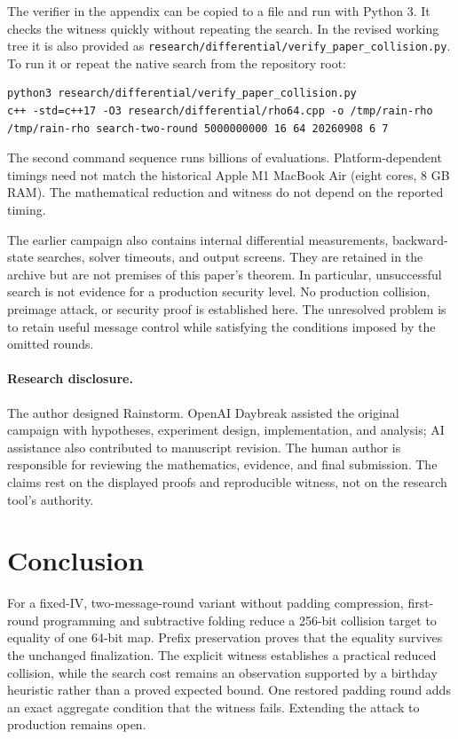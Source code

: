 \documentclass[10pt]{article}
\theoremstyle{definition}
\begin{document}
The verifier in the appendix can be copied to a file and run with Python 3. It checks the witness quickly without repeating the search. In the revised working tree it is also provided as \nolinkurl{research/differential/verify_paper_collision.py}. To run it or repeat the native search from the repository root:
\begin{lstlisting}[style=code]
python3 research/differential/verify_paper_collision.py
c++ -std=c++17 -O3 research/differential/rho64.cpp -o /tmp/rain-rho
/tmp/rain-rho search-two-round 5000000000 16 64 20260908 6 7
\end{lstlisting}
The second command sequence runs billions of evaluations. Platform-dependent timings need not match the historical Apple M1 MacBook Air (eight cores, 8 GB RAM). The mathematical reduction and witness do not depend on the reported timing.

The earlier campaign also contains internal differential measurements, backward-state searches, solver timeouts, and output screens. They are retained in the archive but are not premises of this paper's theorem. In particular, unsuccessful search is not evidence for a production security level. No production collision, preimage attack, or security proof is established here. The unresolved problem is to retain useful message control while satisfying the conditions imposed by the omitted rounds.

\paragraph{Research disclosure.}
The author designed Rainstorm. OpenAI Daybreak assisted the original campaign with hypotheses, experiment design, implementation, and analysis; AI assistance also contributed to manuscript revision. The human author is responsible for reviewing the mathematics, evidence, and final submission. The claims rest on the displayed proofs and reproducible witness, not on the research tool's authority.

\section{Conclusion}
For a fixed-IV, two-message-round variant without padding compression, first-round programming and subtractive folding reduce a 256-bit collision target to equality of one 64-bit map. Prefix preservation proves that the equality survives the unchanged finalization. The explicit witness establishes a practical reduced collision, while the search cost remains an observation supported by a birthday heuristic rather than a proved expected bound. One restored padding round adds an exact aggregate condition that the witness fails. Extending the attack to production remains open.
\end{document}
